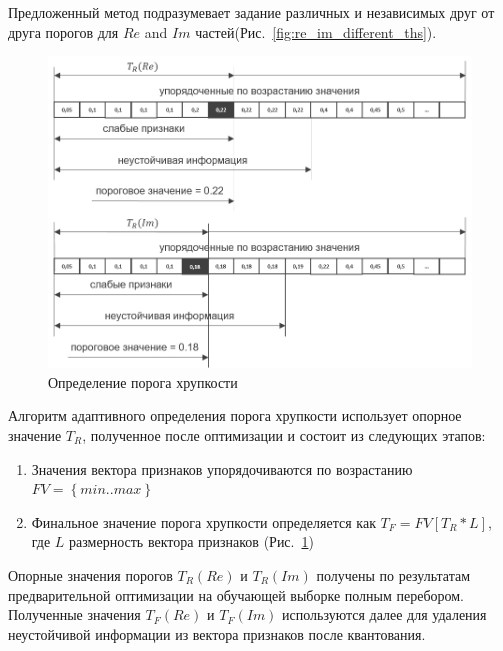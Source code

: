 Предложенный метод подразумевает задание различных и независимых друг от друга порогов для $Re$ and $Im$ частей(Рис.~\ref{fig:re_im_different_ths}).

\begin{figure}[ht!]
	\begin{center}
		\includegraphics[width=0.95\columnwidth]{pictures/thresh_determination.png}
		\caption{Определение порога хрупкости}
		\label{fig:thresh_determination}
	\end{center}
\end{figure}

Алгоритм адаптивного определения порога хрупкости использует опорное значение $T_R$, полученное после оптимизации и состоит из следующих этапов:

\begin{enumerate}
	\setlength\itemsep{0em}\setlength\parskip{0em}\setlength\topsep{0em}\setlength\partopsep{0em}\setlength\parsep{0em} 
	\item{Значения вектора признаков упорядочиваются по возрастанию $FV=\left\lbrace min..max \right\rbrace $}
	\item{Финальное значение порога хрупкости определяется как $T_F=FV[T_R*L]$, где $L$ размерность вектора признаков (Рис.~\ref{fig:thresh_determination})}
\end{enumerate}

Опорные значения порогов $T_R(Re)$ и $T_R(Im)$ получены по результатам предварительной оптимизации на обучающей выборке полным перебором. Полученные значения $T_F(Re)$ и $T_F(Im)$ используются далее для удаления неустойчивой информации из вектора признаков после квантования.

